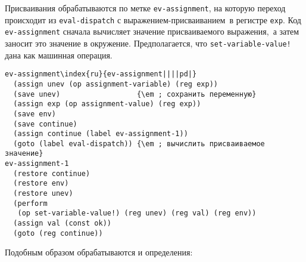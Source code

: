 Присваивания обрабатываются по метке
{\tt ev-assignment}, на которую переход происходит из
{\tt eval-dispatch} с выражением-присваиванием~в регистре
{\tt exp}.  Код {\tt ev-assignment} сначала вычисляет
значение присваиваемого выражения,~а затем заносит это значение в
окружение.  Предполагается, что {\tt set-variable-value!}
дана как машинная операция.

\begin{Verbatim}[fontsize=\small]
ev-assignment\index{ru}{ev-assignment||||pd|}
  (assign unev (op assignment-variable) (reg exp))
  (save unev)                  {\em ; сохранить переменную}
  (assign exp (op assignment-value) (reg exp))
  (save env)
  (save continue)
  (assign continue (label ev-assignment-1))
  (goto (label eval-dispatch)) {\em ; вычислить присваиваемое значение}
ev-assignment-1
  (restore continue)
  (restore env)
  (restore unev)
  (perform
   (op set-variable-value!) (reg unev) (reg val) (reg env))
  (assign val (const ok))
  (goto (reg continue))
\end{Verbatim}

Подобным образом обрабатываются и определения: 

